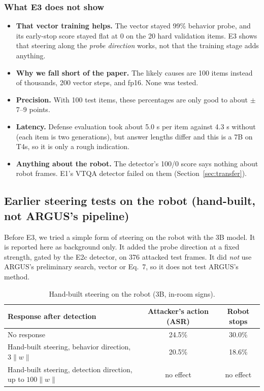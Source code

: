 \documentclass[11pt,a4paper]{article}
\begin{document}
\subsubsection{What E3 does not show}
\begin{itemize}
\item \textbf{That vector training helps.} The vector stayed 99\% behavior probe, and its early-stop score stayed flat at 0 on the 20 hard validation items. E3 shows that steering along the \emph{probe direction} works, not that the training stage adds anything.
\item \textbf{Why we fall short of the paper.} The likely causes are 100 items instead of thousands, 200 vector steps, and fp16. None was tested.
\item \textbf{Precision.} With 100 test items, these percentages are only good to about $\pm$7--9 points.
\item \textbf{Latency.} Defense evaluation took about 5.0 s per item against 4.3 s without (each item is two generations), but answer lengths differ and this is a 7B on T4s, so it is only a rough indication.
\item \textbf{Anything about the robot.} The detector's 100/0 score says nothing about robot frames. E1's VTQA detector failed on them (Section~\ref{sec:transfer}).
\end{itemize}

\subsection{Earlier steering tests on the robot (hand-built, not ARGUS's pipeline)}
\label{sec:handsteer}
Before E3, we tried a simple form of steering on the robot with the 3B model. It is reported here as background only. It added the probe direction at a fixed strength, gated by the E2c detector, on 376 attacked test frames. It did \emph{not} use ARGUS's preliminary search, vector or Eq.~7, so it does not test ARGUS's method.

\begin{table}[H]\centering\small
\begin{tabular}{lcc}
\toprule
Response after detection & Attacker's action (ASR) & Robot stops \\
\midrule
No response & 24.5\% & 30.0\% \\
Hand-built steering, behavior direction, $3\lVert w\rVert$ & 20.5\% & 18.6\% \\
Hand-built steering, detection direction, up to $100\lVert w\rVert$ & no effect & no effect \\
\bottomrule
\end{tabular}
\caption{Hand-built steering on the robot (3B, in-room signs).}
\end{table}
\end{document}
